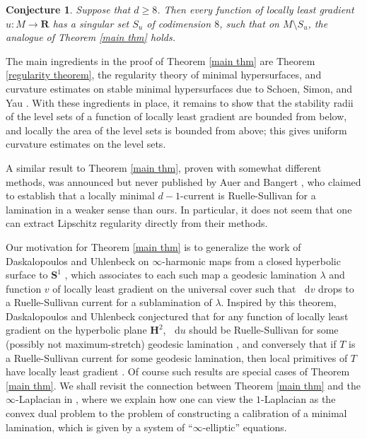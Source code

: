 \documentclass[reqno,11pt]{amsart}
\newcommand{\RR}{\mathbf{R}}
\newcommand{\Hyp}{\mathbf H}
\newcommand{\Sph}{\mathbf S}
\newcommand*\dif{\mathop{}\!\mathrm{d}}
\newtheorem{conjecture}[theorem]{Conjecture}
\theoremstyle{definition}
\numberwithin{equation}{section}
\begin{document}
\begin{conjecture}
Suppose that $d \geq 8$. Then every function of locally least gradient $u: M \to \RR$ has a singular set $S_u$ of codimension $8$, such that on $M \setminus S_u$, the analogue of Theorem \ref{main thm} holds.
\end{conjecture}

The main ingredients in the proof of Theorem \ref{main thm} are Theorem \ref{regularity theorem}, the regularity theory of minimal hypersurfaces, and curvature estimates on stable minimal hypersurfaces due to Schoen, Simon, and Yau \cite{Schoen75,Schoen81}.
With these ingredients in place, it remains to show that the stability radii of the level sets of a function of locally least gradient are bounded from below, and locally the area of the level sets is bounded from above; this gives uniform curvature estimates on the level sets.

A similar result to Theorem \ref{main thm}, proven with somewhat different methods, was announced but never published by Auer and Bangert \cite{Auer01, Auer12}, who claimed to establish that a locally minimal $d - 1$-current is Ruelle-Sullivan for a lamination in a weaker sense than ours.
In particular, it does not seem that one can extract Lipschitz regularity directly from their methods.

Our motivation for Theorem \ref{main thm} is to generalize the work of Daskalopoulos and Uhlenbeck on $\infty$-harmonic maps from a closed hyperbolic surface to $\Sph^1$ \cite{daskalopoulos2020transverse}, which associates to each such map a geodesic lamination $\lambda$ and function $v$ of locally least gradient on the universal cover such that $\dif v$ drops to a Ruelle-Sullivan current for a sublamination of $\lambda$.
Inspired by this theorem, Daskalopoulos and Uhlenbeck conjectured that for any function of locally least gradient on the hyperbolic plane $\Hyp^2$, $\dif u$ should be Ruelle-Sullivan for some (possibly not maximum-stretch) geodesic lamination \cite[Problem 9.4]{daskalopoulos2020transverse}, and conversely that if $T$ is a Ruelle-Sullivan current for some geodesic lamination, then local primitives of $T$ have locally least gradient \cite[Conjecture 9.5]{daskalopoulos2020transverse}.
Of course such results are special cases of Theorem \ref{main thm}.
We shall revisit the connection between Theorem \ref{main thm} and the $\infty$-Laplacian in \cite{BackusInfinityMaxwell1}, where we explain how one can view the $1$-Laplacian as the convex dual problem to the problem of constructing a calibration of a minimal lamination, which is given by a system of ``$\infty$-elliptic'' equations.
\end{document}
